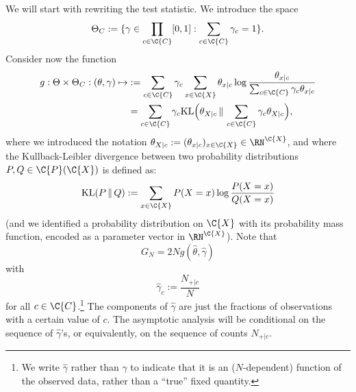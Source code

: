 We will start with rewriting the test statistic. We introduce the space
$$\Theta_C := \{ \gamma \in \prod_{c\in\C{C}} [0,1] : \sum_{c\in\C{C}} \gamma_c = 1 \}.$$
Consider now the function
\begin{equation}\label{eq:G_test_statistics_limit}
  \begin{split}
  g : \Theta \times \Theta_C : (\theta,\gamma) \mapsto
    &:= \sum_{c\in\C{C}} \gamma_c \sum_{x\in\C{X}} \theta_{x|c} \log \frac{\theta_{x|c}}{\sum_{c\in\C{C}} \gamma_c \theta_{x|c}} \\
    & = \sum_{c\in\C{C}} \gamma_c \mathrm{KL}\Big(\theta_{X|c} \,\Vert\, \sum_{c\in\C{C}} \gamma_c \theta_{X|c}\Big),
\end{split}\end{equation}
where we introduced the notation $\theta_{X|c} := (\theta_{x|c})_{x\in\C{X}} \in \RN^{\C{X}}$, and where
the Kullback-Leibler divergence between two probability distributions $P,Q \in \C{P}(\C{X})$ is defined as:
$$\mathrm{KL}(P \,\Vert\, Q) := \sum_{x\in\C{X}} P(X=x) \log \frac{P(X=x)}{Q(X=x)}$$
(and we identified a probability distribution on $\C{X}$ with its probability mass function, encoded as a parameter vector in 
$\RN^\C{X}$).
Note that
$$G_N = 2 N g(\hat\theta, \hat\gamma)$$
with
$$\hat\gamma_c := \frac{N_{+|c}}{N}$$
for all $c\in\C{C}$.\footnote{We write $\hat\gamma$ rather than $\gamma$ to indicate that it is an ($N$-dependent) function of the observed data, rather than a ``true'' fixed quantity.}
The components of $\hat\gamma$ are just the fractions of observations with a certain value of $c$. 
The asymptotic analysis will be conditional on the sequence of $\hat\gamma$'s, or equivalently,
on the sequence of counts $N_{+|c}$.

